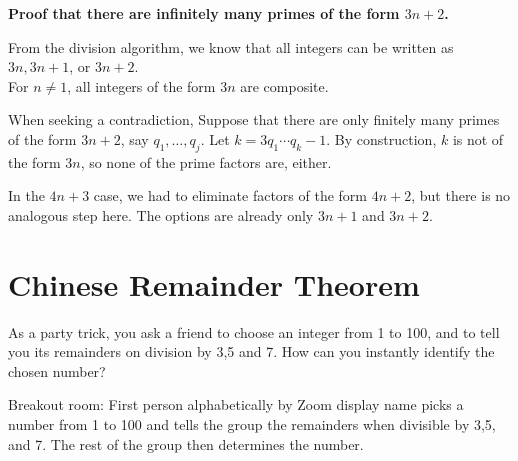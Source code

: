 \documentclass[letterpaper, 11 pt]{article}
\begin{document}
{\bf Proof that there are infinitely many primes of the form $3n+2$.} 

From the division algorithm, we know that all integers can be written as $3n, 3n+1$, or $3n+2.$ 
\\For $n\neq 1$, all integers of the form $3n$ are composite.

When seeking a contradiction, Suppose that there are only finitely many primes of the form  $3n+2$, say $q_1,\dots, q_j$. Let $k=3q_1\cdots q_k -1$. By construction, $k$ is not of the form $3n$, so none of the prime factors are, either.

In the $4n+3$ case, we had to eliminate factors of the form $4n+2$, but there is no analogous step here. The options are already only $3n+1$ and $3n+2$.

\section*{Chinese Remainder Theorem}
\begin{br} As a party trick, you ask a friend to choose an integer from 1 to 100, and to tell you its remainders on division by 3,5 and 7. How can you instantly identify the chosen number?

Breakout room: First person alphabetically by Zoom display name picks a number from 1 to 100 and tells the group the remainders when divisible by 3,5, and 7. The rest of the group then determines the number.
\end{br}
\end{document}
